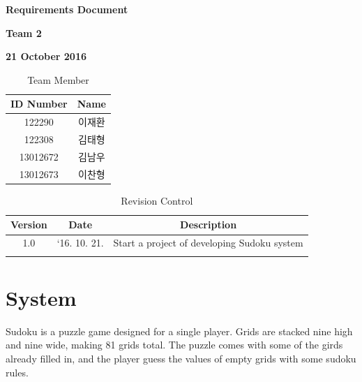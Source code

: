 \documentclass[12pt]{article}
\begin{document}
\vspace*{0.5in}
\centerline{\bf\Huge Requirements Document}
\thispagestyle{empty}
\vspace*{0.5in}
\centerline{\bf\Large Team 2}

\vspace*{0.5in}
\centerline{\bf\Large 21 October 2016}

\vspace*{1.5in}
\begin{table}[b]
\caption{Team Member}
\begin{center}
\begin{tabular}{| c | c |}
\hline
ID Number & Name \\
\hline\hline
122290 & 이재환 \\
\hline
122308 & 김태형 \\
\hline
13012672 & 김남우 \\
\hline
13012673 & 이찬형 \\
\hline
\end{tabular}
\end{center}
\end{table}

\newpage
\thispagestyle{empty}
\begin{table}[hbpt]
\caption{Revision Control}
\begin{center}
\begin{tabular}{| c | c | c |}
\hline
Version & Date & Description \\
\hline\hline
1.0 & `16. 10. 21. & Start a project of developing Sudoku system \\
\hline
 & & \\
\hline

\end{tabular}
\end{center}
\end{table}

\clearpage
\thispagestyle{empty}
\tableofcontents
\listoffigures
\listoftables
\newpage

\clearpage

\section{System}
Sudoku is a puzzle game designed for a single player.
Grids are stacked nine high and nine wide, making 81 grids total. 
The puzzle comes with some of the girds already filled in, and the player guess the values of empty grids with some sudoku rules.
\end{document}
